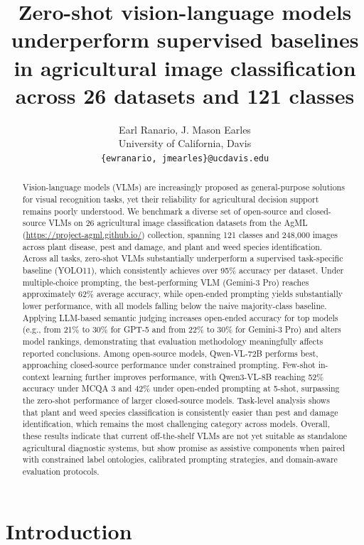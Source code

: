 \documentclass[10pt,letterpaper]{article}
\title{Zero-shot vision-language models underperform supervised baselines in agricultural image classification across 26 datasets and 121 classes}
\author{Earl Ranario, J. Mason Earles\\[4pt]
University of California, Davis\\
\texttt{\{ewranario, jmearles\}@ucdavis.edu}}
\date{}
\begin{document}
\maketitle

\begin{abstract}
Vision-language models (VLMs) are increasingly proposed as general-purpose solutions for visual recognition tasks, yet their reliability for agricultural decision support remains poorly understood. We benchmark a diverse set of open-source and closed-source VLMs on 26 agricultural image classification datasets from the AgML (\url{https://project-agml.github.io/}) collection, spanning 121 classes and 248,000 images across plant disease, pest and damage, and plant and weed species identification. Across all tasks, zero-shot VLMs substantially underperform a supervised task-specific baseline (YOLO11), which consistently achieves over 95\% accuracy per dataset. Under multiple-choice prompting, the best-performing VLM (Gemini-3 Pro) reaches approximately 62\% average accuracy, while open-ended prompting yields substantially lower performance, with all models falling below the naive majority-class baseline. Applying LLM-based semantic judging increases open-ended accuracy for top models (e.g., from 21\% to 30\% for GPT-5 and from 22\% to 30\% for Gemini-3 Pro) and alters model rankings, demonstrating that evaluation methodology meaningfully affects reported conclusions. Among open-source models, Qwen-VL-72B performs best, approaching closed-source performance under constrained prompting. Few-shot in-context learning further improves performance, with Qwen3-VL-8B reaching 52\% accuracy under MCQA 3 and 42\% under open-ended prompting at 5-shot, surpassing the zero-shot performance of larger closed-source models. Task-level analysis shows that plant and weed species classification is consistently easier than pest and damage identification, which remains the most challenging category across models. Overall, these results indicate that current off-the-shelf VLMs are not yet suitable as standalone agricultural diagnostic systems, but show promise as assistive components when paired with constrained label ontologies, calibrated prompting strategies, and domain-aware evaluation protocols.
\end{abstract}

\section{Introduction}
\label{sec:intro}
\end{document}
